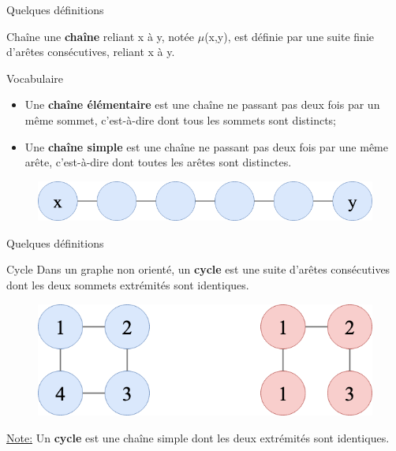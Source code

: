 \documentclass[10pt,xcolor=dvipsnames]{beamer}
\newcommand{\defin}[1]{\textcolor{darkspringgreen}{#1}}
\begin{document}
\begin{frame}{Quelques définitions}
    \begin{exampleblock}{Chaîne}
        une \defin{\textbf{chaîne}} reliant x à y, notée $\mu$(x,y), est définie par une suite finie d'arêtes consécutives, reliant x à y. 
    \end{exampleblock}
    \begin{exampleblock}{Vocabulaire}
            \begin{itemize}
                \item Une \defin{\textbf{chaîne élémentaire}} est une chaîne ne passant pas deux fois par un même sommet, c'est-à-dire dont tous les sommets sont distincts;
                \item Une \defin{\textbf{chaîne simple}} est une chaîne ne passant pas deux fois par une même arête, c'est-à-dire dont toutes les arêtes sont distinctes.
            \end{itemize}
    \end{exampleblock}
    \begin{figure}
        \centering
        \includegraphics[scale=0.3]{figures/CM3/path.png}
        \label{fig:my_label}
    \end{figure}
\end{frame}


\begin{frame}{Quelques définitions}
    \begin{exampleblock}{Cycle}
Dans un graphe non orienté, un \defin{\textbf{cycle}} est une suite d'arêtes consécutives dont les deux sommets extrémités sont identiques.
\end{exampleblock}

\begin{figure}
    \centering
    \includegraphics[scale=0.4]{figures/CM3/cycle-graph.png}
    \label{fig:my_label}
\end{figure}

\underline{Note:} Un \defin{\textbf{cycle}} est une \defin{chaîne simple} dont les deux extrémités sont identiques. 
\end{frame}
\end{document}
